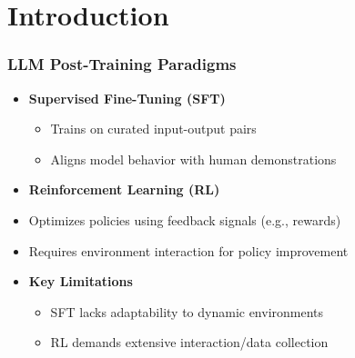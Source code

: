 \section{Introduction}%
\begin{frame}
\frametitle{LLM Post-Training Paradigms}
  \begin{itemize}
    \item \textbf{Supervised Fine-Tuning (SFT)}
      \begin{itemize}
        \item Trains on curated input-output pairs
        \item Aligns model behavior with human demonstrations
      \end{itemize}
    \item \textbf{Reinforcement Learning (RL)}
      \item Optimizes policies using feedback signals (e.g., rewards)
      \item Requires environment interaction for policy improvement
    \item \textbf{Key Limitations}
      \begin{itemize}
        \item SFT lacks adaptability to dynamic environments
        \item RL demands extensive interaction/data collection
      \end{itemize}
  \end{itemize}
\end{frame}%
